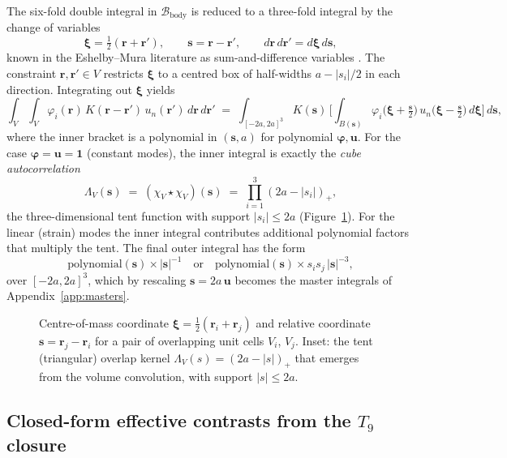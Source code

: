 \documentclass[11pt,a4paper]{article}
\newcommand{\bs}{\bm{s}}
\newcommand{\br}{\bm{r}}
\newcommand{\bxi}{\bm{\xi}}
\newcommand{\bu}{\bm{u}}
\newcommand{\bphi}{\bm{\varphi}}
\newcommand{\indV}{\chi_V}
\theoremstyle{plain}
\theoremstyle{definition}
\theoremstyle{remark}
\begin{document}
The six-fold double integral in $\mathcal{B}_{\mathrm{body}}$ is reduced to
a three-fold integral by the change of variables
\begin{equation}
  \bxi = \tfrac{1}{2}(\br + \br'), \qquad \bs = \br - \br',
  \qquad d\br\,d\br' = d\bxi\,d\bs,
  \label{eq:cm-vars}
\end{equation}
known in the Eshelby--Mura literature as sum-and-difference variables
\cite{eshelby1957,mura1987}.  The constraint $\br,\br' \in V$ restricts
$\bxi$ to a centred box of half-widths $a - |s_i|/2$ in each direction.
Integrating out $\bxi$ yields
\begin{equation}
  \int_{V}\!\!\int_{V}\!\varphi_i(\br)\,K(\br-\br')\,u_n(\br')\,d\br\,d\br'
  \;=\; \int_{[-2a,2a]^{3}}\!K(\bs)\,
    \Big[\int_{B(\bs)}\!\varphi_i\!\bigl(\bxi+\tfrac{\bs}{2}\bigr)\,
         u_n\!\bigl(\bxi-\tfrac{\bs}{2}\bigr)\,d\bxi\Big]\,d\bs,
  \label{eq:cm-reduction}
\end{equation}
where the inner bracket is a polynomial in $(\bs, a)$ for polynomial
$\bphi, \bu$.  For the case $\bphi = \bu = \mathbf{1}$ (constant modes),
the inner integral is exactly the \emph{cube autocorrelation}
\begin{equation}
  \Lambda_V(\bs) \;=\; (\indV \star \indV)(\bs)
  \;=\; \prod_{i=1}^{3}(2a - |s_i|)_+,
  \label{eq:tent}
\end{equation}
the three-dimensional tent function with support $|s_i| \le 2a$
(Figure~\ref{fig:cm-relative}).  For the linear (strain) modes the inner
integral contributes additional polynomial factors that multiply the tent.
The final outer integral has the form
\begin{equation}
  \text{polynomial}(\bs)\times |\bs|^{-1}
  \quad \text{or} \quad
  \text{polynomial}(\bs)\times s_i s_j\,|\bs|^{-3},
\end{equation}
over $[-2a,2a]^3$, which by rescaling $\bs = 2a\,\bu$ becomes the
master integrals of Appendix~\ref{app:masters}.

\begin{figure}[h]
\centering

\caption{%
  Centre-of-mass coordinate $\bxi = \tfrac{1}{2}(\br_i + \br_j)$ and
  relative coordinate $\bs = \br_j - \br_i$ for a pair of overlapping unit
  cells $V_i$, $V_j$.  Inset: the tent (triangular) overlap kernel
  $\Lambda_V(s) = (2a - |s|)_+$ that emerges from the volume convolution,
  with support $|s| \le 2a$.%
}
\label{fig:cm-relative}
\end{figure}

\subsection{Closed-form effective contrasts from the $T_9$ closure}
\label{sec:t9-contrasts}
\end{document}

